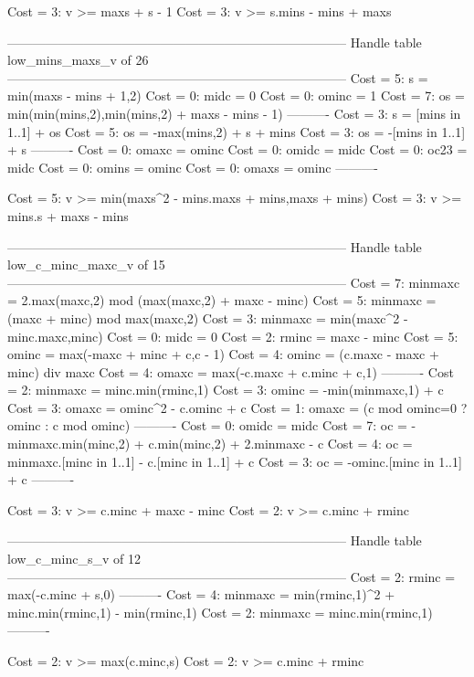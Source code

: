 Cost =  3:  v >= maxs + s - 1
Cost =  3:  v >= s.mins - mins + maxs

--------------------------------------------------------------------------------
Handle table low_mins_maxs_v of 26
--------------------------------------------------------------------------------
Cost =  5:  s     = min(maxs - mins + 1,2)
Cost =  0:  midc  = 0
Cost =  0:  ominc = 1
Cost =  7:  os    = min(min(mins,2),min(mins,2) + maxs - mins - 1)
----------
Cost =  3:  s     = [mins in 1..1] + os
Cost =  5:  os    = -max(mins,2) + s + mins
Cost =  3:  os    = -[mins in 1..1] + s
----------
Cost =  0:  omaxc = ominc
Cost =  0:  omidc = midc
Cost =  0:  oc23  = midc
Cost =  0:  omins = ominc
Cost =  0:  omaxs = ominc
----------

Cost =  5:  v >= min(maxs^2 - mins.maxs + mins,maxs + mins)
Cost =  3:  v >= mins.s + maxs - mins

--------------------------------------------------------------------------------
Handle table low_c_minc_maxc_v of 15
--------------------------------------------------------------------------------
Cost =  7:  minmaxc = 2.max(maxc,2) mod (max(maxc,2) + maxc - minc)
Cost =  5:  minmaxc = (maxc + minc) mod max(maxc,2)
Cost =  3:  minmaxc = min(maxc^2 - minc.maxc,minc)
Cost =  0:  midc    = 0
Cost =  2:  rminc   = maxc - minc
Cost =  5:  ominc   = max(-maxc + minc + c,c - 1)
Cost =  4:  ominc   = (c.maxc - maxc + minc) div maxc
Cost =  4:  omaxc   = max(-c.maxc + c.minc + c,1)
----------
Cost =  2:  minmaxc = minc.min(rminc,1)
Cost =  3:  ominc   = -min(minmaxc,1) + c
Cost =  3:  omaxc   = ominc^2 - c.ominc + c
Cost =  1:  omaxc   = (c mod ominc=0 ? ominc : c mod ominc)
----------
Cost =  0:  omidc   = midc
Cost =  7:  oc      = -minmaxc.min(minc,2) + c.min(minc,2) + 2.minmaxc - c
Cost =  4:  oc      = minmaxc.[minc in 1..1] - c.[minc in 1..1] + c
Cost =  3:  oc      = -ominc.[minc in 1..1] + c
----------

Cost =  3:  v >= c.minc + maxc - minc
Cost =  2:  v >= c.minc + rminc

--------------------------------------------------------------------------------
Handle table low_c_minc_s_v of 12
--------------------------------------------------------------------------------
Cost =  2:  rminc   = max(-c.minc + s,0)
----------
Cost =  4:  minmaxc = min(rminc,1)^2 + minc.min(rminc,1) - min(rminc,1)
Cost =  2:  minmaxc = minc.min(rminc,1)
----------

Cost =  2:  v >= max(c.minc,s)
Cost =  2:  v >= c.minc + rminc

